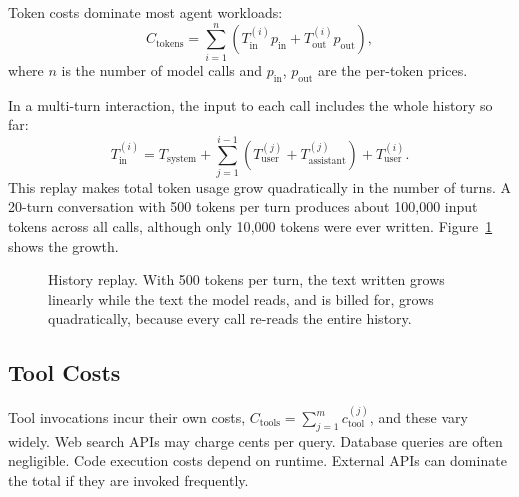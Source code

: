 \documentclass[11pt]{book}
\begin{document}
Token costs dominate most agent workloads:
\[
C_{\text{tokens}} = \sum_{i=1}^{n} \left( T_{\text{in}}^{(i)} p_{\text{in}} + T_{\text{out}}^{(i)} p_{\text{out}} \right),
\]
where $n$ is the number of model calls and $p_{\text{in}}$, $p_{\text{out}}$ are the per-token prices.

In a multi-turn interaction, the input to each call includes the whole history so far:
\[
T_{\text{in}}^{(i)} = T_{\text{system}} + \sum_{j=1}^{i-1} \left( T_{\text{user}}^{(j)} + T_{\text{assistant}}^{(j)} \right) + T_{\text{user}}^{(i)}.
\]
This replay makes total token usage grow quadratically in the number of turns. A 20-turn conversation with 500 tokens per turn produces about 100{,}000 input tokens across all calls, although only 10{,}000 tokens were ever written. Figure~\ref{fig:replay} shows the growth.

\begin{figure}[htbp]
\centering
{}
\caption{History replay. With 500 tokens per turn, the text written grows linearly while the text the model reads, and is billed for, grows quadratically, because every call re-reads the entire history.}
\label{fig:replay}
\end{figure}

\subsection{Tool Costs}

Tool invocations incur their own costs, $C_{\text{tools}} = \sum_{j=1}^{m} c_{\text{tool}}^{(j)}$, and these vary widely. Web search APIs may charge cents per query. Database queries are often negligible. Code execution costs depend on runtime. External APIs can dominate the total if they are invoked frequently.
\end{document}
